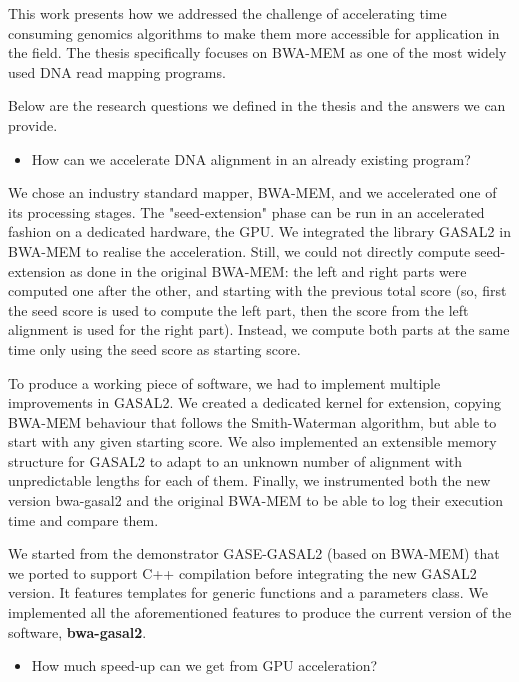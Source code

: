 This work presents how we addressed the challenge of accelerating time consuming genomics algorithms to make them more accessible for application in the field. The thesis specifically focuses on BWA-MEM as one of the most widely used DNA read mapping programs.

Below are the research questions we defined in the thesis and the answers we can provide.

\begin{itemize}
	\item How can we accelerate DNA alignment in an already existing program?
\end{itemize}	

We chose an industry standard mapper, BWA-MEM, and we accelerated one of its processing stages. The "seed-extension" phase can be run in an accelerated fashion on a dedicated hardware, the GPU. We integrated the library GASAL2 in BWA-MEM to realise the acceleration. Still, we could not directly compute seed-extension as done in the original BWA-MEM: the left and right parts were computed one after the other, and starting with the previous total score (so, first the seed score is used to compute the left part, then the score from the left alignment is used for the right part). Instead, we compute both parts at the same time only using the seed score as starting score.

To produce a working piece of software, we had to implement multiple improvements in GASAL2. We created a dedicated kernel for extension, copying BWA-MEM behaviour that follows the Smith-Waterman algorithm, but able to start with any given starting score. We also implemented an extensible memory structure for GASAL2 to adapt to an unknown number of alignment with unpredictable lengths for each of them. Finally, we instrumented both the new version bwa-gasal2 and the original BWA-MEM to be able to log their execution time and compare them. 

We started from the demonstrator GASE-GASAL2 (based on BWA-MEM) that we ported to support C++ compilation before integrating the new GASAL2 version. It features templates for generic functions and a parameters class. We implemented all the aforementioned features to produce the current version of the software, \textbf{bwa-gasal2}.

\begin{itemize}
	\item How much speed-up can we get from GPU acceleration?
\end{itemize}

